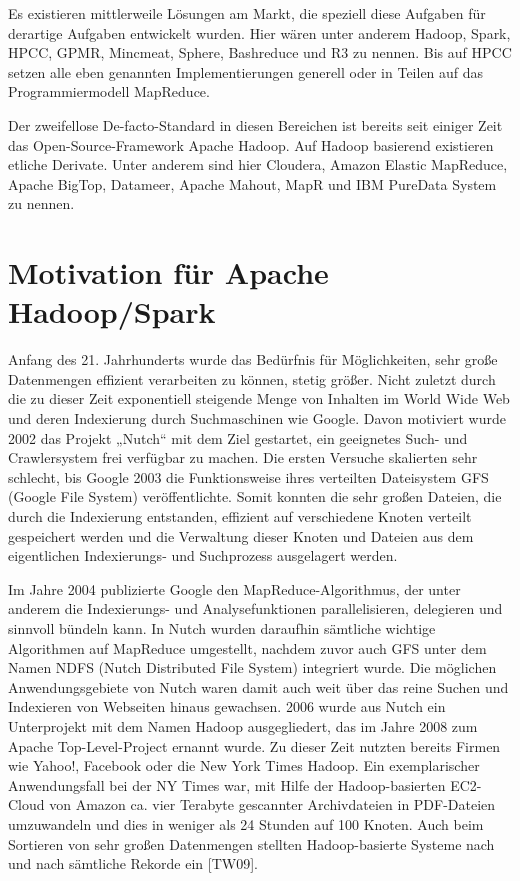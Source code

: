Es existieren mittlerweile Lösungen am Markt, die speziell diese Aufgaben für derartige Aufgaben entwickelt wurden. Hier wären unter anderem Hadoop, Spark, HPCC, GPMR, Mincmeat, Sphere, Bashreduce und R3 zu nennen. Bis auf HPCC setzen alle eben genannten Implementierungen generell oder in Teilen auf das Programmiermodell MapReduce. 

Der zweifellose De-facto-Standard in diesen Bereichen ist bereits seit einiger Zeit das Open-Source-Framework Apache Hadoop. Auf Hadoop basierend existieren etliche Derivate. Unter anderem sind hier Cloudera, Amazon Elastic MapReduce, Apache BigTop, Datameer, Apache Mahout, MapR und IBM PureData System zu nennen. 



	





\section{Motivation für Apache Hadoop/Spark}
\label{section:motivation für Apache Hadoop/Spark}

Anfang des 21. Jahrhunderts wurde das Bedürfnis für Möglichkeiten, sehr große Datenmengen effizient verarbeiten zu können, stetig größer. Nicht zuletzt durch die zu dieser Zeit exponentiell steigende Menge von Inhalten im World Wide Web und deren Indexierung durch Suchmaschinen wie Google. Davon motiviert wurde 2002 das Projekt „Nutch“ mit dem Ziel gestartet, ein geeignetes Such- und Crawlersystem frei verfügbar zu machen. Die ersten Versuche skalierten sehr schlecht, bis Google 2003 die Funktionsweise ihres verteilten Dateisystem GFS (Google File System) veröffentlichte. Somit konnten die sehr großen Dateien, die durch die Indexierung entstanden, effizient auf verschiedene Knoten verteilt gespeichert werden und die Verwaltung dieser Knoten und Dateien aus dem eigentlichen Indexierungs- und Suchprozess ausgelagert werden. 

Im Jahre 2004 publizierte Google den MapReduce-Algorithmus, der unter anderem die Indexierungs- und Analysefunktionen parallelisieren, delegieren und sinnvoll bündeln kann. In Nutch wurden daraufhin sämtliche wichtige Algorithmen auf MapReduce umgestellt, nachdem zuvor auch GFS unter dem Namen NDFS (Nutch Distributed File System) integriert wurde. Die möglichen Anwendungsgebiete von Nutch waren damit auch weit über das reine Suchen und Indexieren von Webseiten hinaus gewachsen. 2006 wurde aus Nutch ein Unterprojekt mit dem Namen Hadoop ausgegliedert, das im Jahre 2008 zum Apache Top-Level-Project ernannt wurde. Zu dieser Zeit nutzten bereits Firmen wie Yahoo!, Facebook oder die New York Times Hadoop. Ein exemplarischer Anwendungsfall bei der NY Times war, mit Hilfe der Hadoop-basierten EC2-Cloud von Amazon ca. vier Terabyte gescannter Archivdateien in PDF-Dateien umzuwandeln und dies in weniger als 24 Stunden auf 100 Knoten. Auch beim Sortieren von sehr großen Datenmengen stellten Hadoop-basierte Systeme nach und nach sämtliche Rekorde ein [TW09]. 

